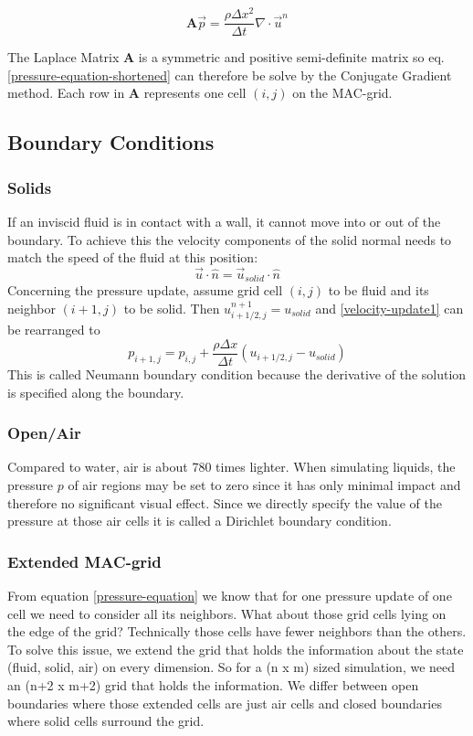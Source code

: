 \begin{equation} \label{pressure-equation-shortened}
	\mathbf{A}\vec{p} = \frac{\rho \Delta x^2}{\Delta t}\nabla \cdot \vec{u}^n
\end{equation}

The Laplace Matrix $\mathbf{A}$ is a symmetric and positive semi-definite matrix so eq. \ref{pressure-equation-shortened} can therefore be solve by the Conjugate Gradient method. Each row in \textbf{A} represents one cell $(i, j)$ on the MAC-grid. 


\subsection{Boundary Conditions}
\subsubsection{Solids}
If an inviscid fluid is in contact with a wall, it cannot move into or out of the boundary. To achieve this the velocity components of the solid normal needs to match the speed of the fluid at this position:
\begin{equation} \label{navier-stokes12}
    \vec{u} \cdot \hat{n} = \vec{u}_{solid} \cdot \hat{n}
\end{equation}
Concerning the pressure update, assume grid cell $(i,j)$ to be fluid and its neighbor $(i+1,j)$ to be solid. Then $u_{i+1/2,j}^{n+1} = u_{solid}$ and \ref{velocity-update1} can be rearranged to 
\begin{equation} \label{navier-stokes12}
    p_{i+1,j} = p_{i,j} + \frac{\rho \Delta x}{\Delta t} (u_{i+1/2,j} - u_{solid})
\end{equation}
This is called Neumann boundary condition because the derivative of the solution is specified along the boundary.
\newpage
\subsubsection{Open/Air}
Compared to water, air is about 780 times lighter. When simulating liquids, the pressure $p$ of air regions may be set to zero since it has only minimal impact and therefore no significant visual effect. Since we directly specify the value of the pressure at those air cells it is called a Dirichlet boundary condition.


\subsubsection{Extended MAC-grid}
From equation \ref{pressure-equation} we know that for one pressure update of one cell we need to consider all its neighbors. What about those grid cells lying on the edge of the grid? Technically those cells have fewer neighbors than the others. To solve this issue, we extend the grid that holds the information about the state (fluid, solid, air) on every dimension. So for a (n x m) sized simulation, we need an (n+2 x m+2) grid that holds the information. We differ between open boundaries where those extended cells are just air cells and closed boundaries where solid cells surround the grid.

